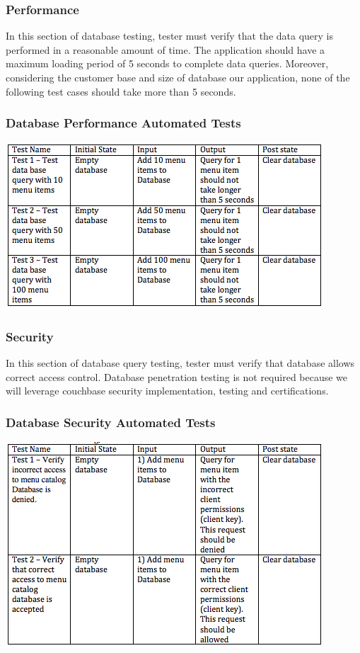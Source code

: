 \documentclass[12pt]{article}
\begin{document}
\subsubsection{Performance}
In this section of database testing, tester must verify that the data query is performed in a reasonable amount of time. The application should have a maximum loading period of 5 seconds to complete data queries. Moreover, considering the customer base and size of database our application, none of the following test cases should take more than 5 seconds.
\subsubsection{Database Performance Automated Tests }
\includegraphics[width=\textwidth,height=\textheight,keepaspectratio]{performance_tests.png}

\subsubsection{Security}
In this section of database query testing, tester must verify that database allows correct access control. Database penetration testing is not required because we will leverage couchbase security implementation, testing and certifications.
\subsubsection{Database Security Automated Tests }
\includegraphics[width=\textwidth,height=\textheight,keepaspectratio]{Security_tests.png}
\end{document}
